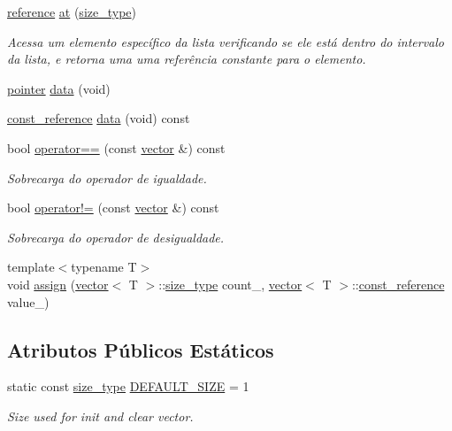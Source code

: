 \begin{DoxyCompactItemize}
\hyperlink{classsc_1_1vector_a37394c8a6b82c4a0709737d7982e32b2}{reference} \hyperlink{classsc_1_1vector_ae3f1a60bf1dac7bdf96b78e708d6e2ca}{at} (\hyperlink{classsc_1_1vector_a48bf37ba1a6d0c13504414d86e27c399}{size\+\_\+type})
\begin{DoxyCompactList}\small\item\em Acessa um elemento específico da lista verificando se ele está dentro do intervalo da lista, e retorna uma uma referência constante para o elemento. \end{DoxyCompactList}\item 
\hyperlink{classsc_1_1vector_a0348a6e1e249e051964a2bc94b05527a}{pointer} \hyperlink{classsc_1_1vector_a8c08600b61d36dd7f76c93f199fbf142}{data} (void)
\item 
\hyperlink{classsc_1_1vector_a8da2b1a11b069241100f9b2e14f481a0}{const\+\_\+reference} \hyperlink{classsc_1_1vector_a91112807482b4d0f6e13096063263eb5}{data} (void) const
\item 
bool \hyperlink{classsc_1_1vector_a14470a2d43b26c15f0f7aaeeb6ae4f04}{operator==} (const \hyperlink{classsc_1_1vector}{vector} \&) const
\begin{DoxyCompactList}\small\item\em Sobrecarga do operador de igualdade. \end{DoxyCompactList}\item 
bool \hyperlink{classsc_1_1vector_a9cf88e668b52a2a00961378d60812064}{operator!=} (const \hyperlink{classsc_1_1vector}{vector} \&) const
\begin{DoxyCompactList}\small\item\em Sobrecarga do operador de desigualdade. \end{DoxyCompactList}\item 
{\footnotesize template$<$typename T$>$ }\\void \hyperlink{classsc_1_1vector_a70d7074754cd062c66a968f5d3b5ad2a}{assign} (\hyperlink{classsc_1_1vector}{vector}$<$ T $>$\+::\hyperlink{classsc_1_1vector_a48bf37ba1a6d0c13504414d86e27c399}{size\+\_\+type} count\+\_\+, \hyperlink{classsc_1_1vector}{vector}$<$ T $>$\+::\hyperlink{classsc_1_1vector_a8da2b1a11b069241100f9b2e14f481a0}{const\+\_\+reference} value\+\_\+)
\end{DoxyCompactItemize}
\subsection*{Atributos Públicos Estáticos}
\begin{DoxyCompactItemize}
\item 
static const \hyperlink{classsc_1_1vector_a48bf37ba1a6d0c13504414d86e27c399}{size\+\_\+type} \hyperlink{classsc_1_1vector_a287b97d30cd9f7540da7d5ef628e49a7}{D\+E\+F\+A\+U\+L\+T\+\_\+\+S\+I\+ZE} = 1
\begin{DoxyCompactList}\small\item\em Size used for init and clear vector. \end{DoxyCompactList}\end{DoxyCompactItemize}
